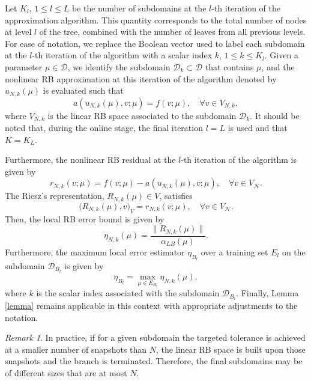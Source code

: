 \documentclass[12pt]{article}
\theoremstyle{remark}
\newtheorem{remark}{Remark}[section]
\theoremstyle{definition}
\numberwithin{equation}{section}
\begin{document}
Let $K_l$, $1 \leq l \leq L$ be the number of subdomains at the $l$-th iteration of the approximation algorithm. This quantity corresponds to the total number of nodes at level $l$ of the tree, combined with the number of leaves from all previous levels. For ease of notation, we replace the Boolean vector used to label each subdomain at the $l$-th iteration of the algorithm with a scalar index $k$, $1 \leq k \leq K_l$. Given a parameter $\mu \in \mathcal{D}$, we identify the subdomain $\mathcal{D}_k \subset \mathcal{D}$ that contains $\mu$, and the nonlinear RB approximation at this iteration of the algorithm denoted by $u_{N,k}(\mu)$ is evaluated such that 
\begin{equation}
    a(u_{N,k}(\mu), v ; \mu)=f(v ; \mu), \quad \forall v \in V_{N,k},
\end{equation}
where $V_{N,k}$ is the linear RB space associated to the subdomain $\mathcal{D}_k$. It should be noted that, during the online stage, the final iteration $l=L$ is used and that $K=K_L$.

Furthermore, the nonlinear RB residual at the $l$-th iteration of the algorithm is given by
\begin{equation}
    r_{N,k}(v;\mu)=f(v;\mu)-a(u_{N,k}(\mu),v;\mu), \quad \forall v \in V_{\mathcal{N}}.
\end{equation}
The Riesz's representation, $R_{N,k}(\mu) \in V$, satisfies
\begin{equation}
    \big(R_{N,k}(\mu),v\big)_V=r_{N,k}(v;\mu),\quad \forall v \in V_{\mathcal{N}}.
\end{equation}
Then, the local RB error bound is given by 
\begin{equation}
    \eta_{N,k}(\mu)=\frac{\|R_{N,k}(\mu)\|}{\alpha_{LB}(\mu)}.
\end{equation}
Furthermore, the maximum local error estimator $\eta_{B_l}$ over a training set $E_l$ on the subdomain $\mathcal{D}_{B_l}$ is given by  
\begin{equation}
     \eta_{B_l}=\max\limits_{\mu\in E_{B_l}} \eta_{N,k}(\mu), 
\end{equation}
where $k$ is the scalar index associated with the subdomain $\mathcal{D}_{B_l}$. Finally, Lemma \eqref{lemma} remains applicable in this context with appropriate adjustments to the notation.

\begin{remark}
In practice, if for a given subdomain the targeted tolerance is achieved at a smaller number of snapshots than $N$, the linear RB space is built upon those snapshots and the branch is terminated. Therefore, the final subdomains may be of different sizes that are at most $N$.
\end{remark}
\end{document}
